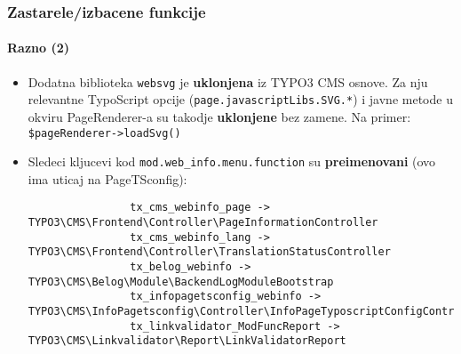 
\begin{frame}[fragile]
	\frametitle{Zastarele/izbacene funkcije}
	\framesubtitle{Razno (2)}

	\lstset{basicstyle=\tiny\ttfamily}

	\begin{itemize}

		\item Dodatna biblioteka \texttt{websvg} je \textbf{uklonjena} iz TYPO3 CMS osnove.
			Za nju relevantne TypoScript opcije	(\texttt{page.javascriptLibs.SVG.*}) i javne metode u okviru
			PageRenderer-a su takodje \textbf{uklonjene} bez zamene.\newline
			Na primer: \texttt{\$pageRenderer->loadSvg()}

		\item Sledeci kljucevi kod \texttt{mod.web\_info.menu.function}
			su \textbf{preimenovani} (ovo ima uticaj na PageTSconfig):

			\begin{lstlisting}
				tx_cms_webinfo_page -> TYPO3\CMS\Frontend\Controller\PageInformationController
				tx_cms_webinfo_lang -> TYPO3\CMS\Frontend\Controller\TranslationStatusController
				tx_belog_webinfo -> TYPO3\CMS\Belog\Module\BackendLogModuleBootstrap
				tx_infopagetsconfig_webinfo -> TYPO3\CMS\InfoPagetsconfig\Controller\InfoPageTyposcriptConfigController
				tx_linkvalidator_ModFuncReport -> TYPO3\CMS\Linkvalidator\Report\LinkValidatorReport
			\end{lstlisting}

	\end{itemize}

\end{frame}


